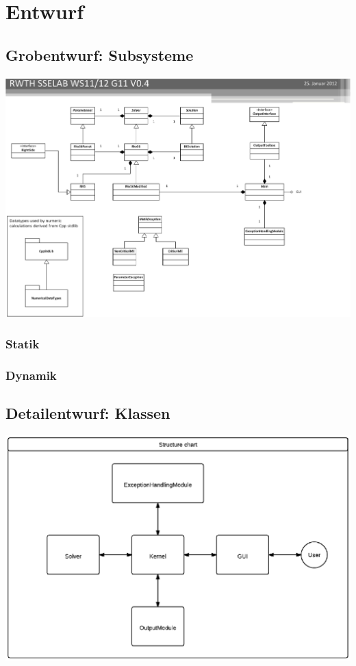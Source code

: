\chapter{Entwurf}
\label{ch:3}

\section{Grobentwurf: Subsysteme}
\label{sec:3.1}
\includegraphics[width=6in,keepaspectratio=true]{RWTH_SSELAB_WS1112_CLASSES.eps}

\subsection{Statik}

\subsection{Dynamik}

\section{Detailentwurf: Klassen}
\label{sec:3.2}
\includegraphics[width=6in,keepaspectratio=true]{figures/StructureDiagGyroSim.eps}

